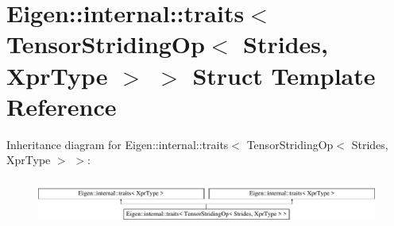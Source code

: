 \hypertarget{struct_eigen_1_1internal_1_1traits_3_01_tensor_striding_op_3_01_strides_00_01_xpr_type_01_4_01_4}{}\section{Eigen\+:\+:internal\+:\+:traits$<$ Tensor\+Striding\+Op$<$ Strides, Xpr\+Type $>$ $>$ Struct Template Reference}
\label{struct_eigen_1_1internal_1_1traits_3_01_tensor_striding_op_3_01_strides_00_01_xpr_type_01_4_01_4}
Inheritance diagram for Eigen\+:\+:internal\+:\+:traits$<$ Tensor\+Striding\+Op$<$ Strides, Xpr\+Type $>$ $>$\+:\begin{figure}[H]
\begin{center}
\leavevmode
\includegraphics[height=1.485411cm]{struct_eigen_1_1internal_1_1traits_3_01_tensor_striding_op_3_01_strides_00_01_xpr_type_01_4_01_4}
\end{center}
\end{figure}

